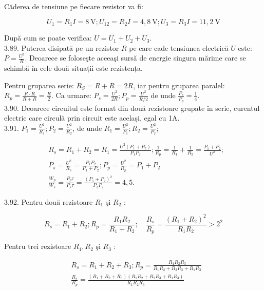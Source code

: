 Căderea de tensiune pe fiecare rezistor va fi:

$$
U_{1}=R_{1} I=8 \mathrm{~V} ; U_{12}=R_{2} I=4,8 \mathrm{~V} ; U_{3}=R_{3} I=11,2 \mathrm{~V}
$$

După cum se poate verifica: $U=U_{1}+U_{2}+U_{3}$.\\
3.89. Puterea disipată pe un rezistor $R$ pe care cade tensiunea electrică $U$ este: $P=\frac{U^{2}}{R}$. Deoarece se foloseşte aceeaşi sursă de energie singura mărime care se schimbă în cele două situații este rezistența.

Pentru gruparea serie: $R_{S}=R+R=2 R$, iar pentru gruparea paralel: $R_{p}=\frac{R \cdot R}{R+R}=\frac{R}{2}$. Ca urmare: $P_{s}=\frac{U^{2}}{2 R} ; P_{p}=\frac{U^{2}}{R / 2}$ de unde $\frac{P_{s}}{P_{p}}=\frac{1}{4}$.\\
3.90. Deoarece circuitul este format din două rezistoare grupate în serie, curentul electric care circulă prin circuit este același, egal cu 1A.\\
3.91. $P_{1}=\frac{U^{2}}{R_{1}} ; P_{2}=\frac{U^{2}}{R_{2}}$, de unde $R_{1}=\frac{U^{2}}{P_{1}} ; R_{2}=\frac{U^{2}}{P_{2}}$;

$$
\begin{aligned}
& R_{s}=R_{1}+R_{2}=R_{1}=\frac{U^{2}\left(P_{1}+P_{2}\right)}{P_{1} P_{2}} ; \frac{1}{R_{p}}=\frac{1}{R_{1}}+\frac{1}{R_{2}}=\frac{P_{1}+P_{2}}{U^{2}} ; \\
& P_{s}=\frac{U^{2}}{R_{s}}=\frac{P_{1} P_{2}}{P_{1}+P_{2}} ; P_{p}=\frac{U^{2}}{R_{p}}=P_{1}+P_{2} \\
& \frac{W_{p}}{W_{s}}=\frac{P_{p} \tau}{P_{s} \tau}=\frac{\left(P_{1}+P_{2}\right)^{2}}{P_{1} P_{2}}=4,5 .
\end{aligned}
$$

3.92. Pentru două rezistoare $R_{1}$ şi $R_{2}$ :

$$
R_{s}=R_{1}+R_{2} ; R_{p}=\frac{R_{1} R_{2}}{R_{1}+R_{2}} ; \quad \frac{R_{s}}{R_{p}}=\frac{\left(R_{1}+R_{2}\right)^{2}}{R_{1} R_{2}}>2^{2}
$$

Pentru trei rezistoare $R_{1}, R_{2}$ şi $R_{3}$ :

$$
\begin{aligned}
& R_{s}=R_{1}+R_{2}+R_{3} ; R_{p}=\frac{R_{1} R_{2} R_{3}}{R_{1} R_{2}+R_{2} R_{3}+R_{1} R_{3}} \\
& \frac{R_{s}}{R_{p}}=\frac{\left(R_{1}+R_{2}+R_{3}\right)\left(R_{1} R_{2}+R_{2} R_{3}+R_{1} R_{3}\right)}{R_{1} R_{2} R_{3}}
\end{aligned}
$$


